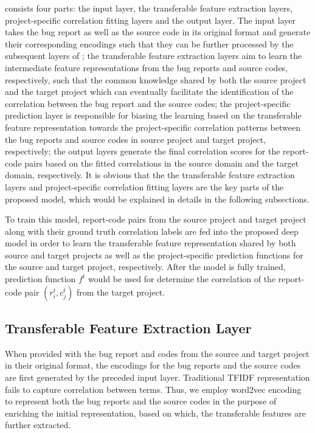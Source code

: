 \TRANPCNN consists four parts: the input layer, the transferable feature extraction layers, project-specific correlation fitting layers and the output layer. The input layer takes the bug report as well as the source code in its original format and generate their corresponding encodings such that they can be further processed by the subsequent layers of \TRANPCNN; the transferable feature extraction layers aim to learn the intermediate feature representations from the bug reports and source codes, respectively, such that the common knowledge shared by both the source project and the target project which can eventually facilitate the identification of the correlation between the bug report and the source codes; the project-specific prediction layer is responsible for biasing the learning based on the transferable feature representation towards the project-specific correlation patterns between the bug reports and source codes in source project and target project, respectively; the output layers generate the final correlation scores for the report-code pairs based on the fitted correlations in the source domain and the target domain, respectively. It is obvious that the the transferable feature extraction layers and project-specific correlation fitting layers are the key parts of the proposed model, which would be explained in details in the following subsections.

To train this model, report-code pairs from the source project and target project along with their ground truth correlation labels are fed into the proposed deep model in order to learn the transferable feature representation shared by both source and target projects as well as the project-specific prediction functions for the source and target project, respectively. After the model is fully trained, prediction function $f^{t}$ would be used for determine the correlation of the report-code pair $(r_i^t, c_j^t)$ from the target project.

\subsection{Transferable Feature Extraction Layer}
When provided with the bug report and codes from the source and target project in their original format, the encodings for the bug reports and the source codes are first generated by the preceded input layer. Traditional TFIDF representation fails to capture correlation between terms. Thus, we employ word2vec encoding to represent both the bug reports and the source codes in the purpose of enriching the initial representation, based on which, the transferable features are further extracted.

